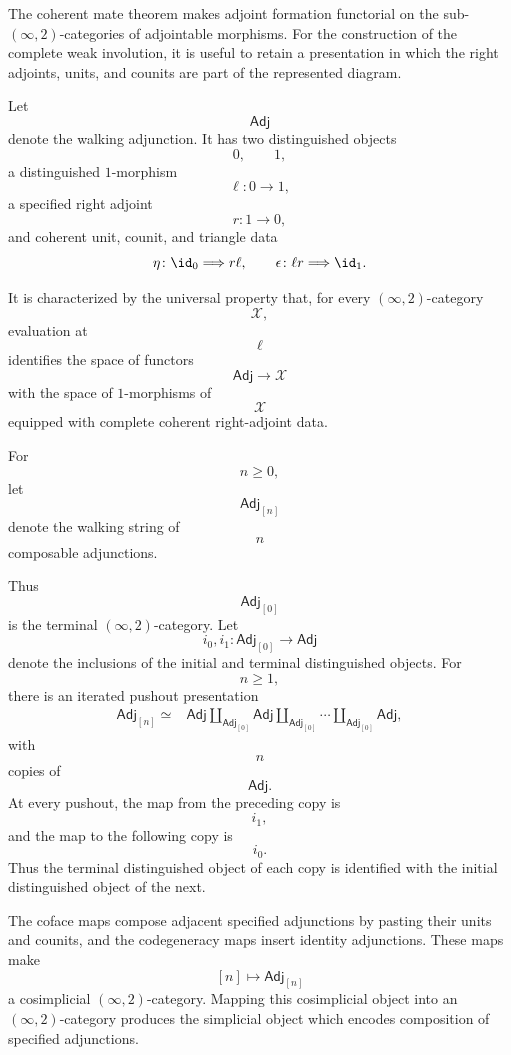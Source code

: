 The coherent mate theorem makes adjoint formation functorial on the
sub-$(\infty,2)$-categories of adjointable morphisms. For the construction
of the complete weak involution, it is useful to retain a presentation in
which the right adjoints, units, and counits are part of the represented
diagram.

\begin{definition}
\label{def:walking-adjunction}
Let
\[
    \mathsf{Adj}
\]
denote the walking adjunction. It has two distinguished objects
\[
    0,
    \qquad
    1,
\]
a distinguished $1$-morphism
\[
    \ell
    \colon
    0
    \longrightarrow
    1,
\]
a specified right adjoint
\[
    r
    \colon
    1
    \longrightarrow
    0,
\]
and coherent unit, counit, and triangle data
\[
    \eta
    \colon
    \id_0
    \Longrightarrow
    r\ell,
    \qquad
    \epsilon
    \colon
    \ell r
    \Longrightarrow
    \id_1.
\]

It is characterized by the universal property that, for every
$(\infty,2)$-category
\[
    \mathcal X,
\]
evaluation at
\[
    \ell
\]
identifies the space of functors
\[
    \mathsf{Adj}
    \longrightarrow
    \mathcal X
\]
with the space of $1$-morphisms of
\[
    \mathcal X
\]
equipped with complete coherent right-adjoint data.
\end{definition}

\begin{construction}
\label{con:walking-strings-adjunctions}
For
\[
    n\geq 0,
\]
let
\[
    \mathsf{Adj}_{[n]}
\]
denote the walking string of
\[
    n
\]
composable adjunctions.

Thus
\[
    \mathsf{Adj}_{[0]}
\]
is the terminal $(\infty,2)$-category. Let
\[
    i_0,i_1
    \colon
    \mathsf{Adj}_{[0]}
    \longrightarrow
    \mathsf{Adj}
\]
denote the inclusions of the initial and terminal distinguished objects.
For
\[
    n\geq 1,
\]
there is an iterated pushout presentation
\[
\begin{aligned}
    \mathsf{Adj}_{[n]}
    \simeq{}&
    \mathsf{Adj}
    \amalg_{\mathsf{Adj}_{[0]}}
    \mathsf{Adj}
    \amalg_{\mathsf{Adj}_{[0]}}
    \cdots
    \amalg_{\mathsf{Adj}_{[0]}}
    \mathsf{Adj},
\end{aligned}
\]
with
\[
    n
\]
copies of
\[
    \mathsf{Adj}.
\]
At every pushout, the map from the preceding copy is
\[
    i_1,
\]
and the map to the following copy is
\[
    i_0.
\]
Thus the terminal distinguished object of each copy is identified with
the initial distinguished object of the next.

The coface maps compose adjacent specified adjunctions by pasting their
units and counits, and the codegeneracy maps insert identity adjunctions.
These maps make
\[
    [n]\longmapsto\mathsf{Adj}_{[n]}
\]
a cosimplicial $(\infty,2)$-category. Mapping this cosimplicial object
into an $(\infty,2)$-category produces the simplicial object which
encodes composition of specified adjunctions.
\end{construction}

